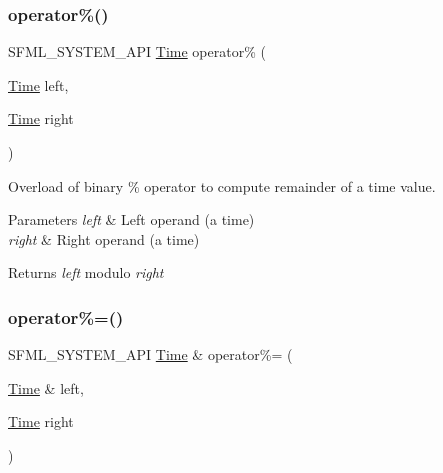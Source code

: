 \subsubsection{\texorpdfstring{operator\%()}{operator\%()}}
{\footnotesize\ttfamily S\+F\+M\+L\+\_\+\+S\+Y\+S\+T\+E\+M\+\_\+\+A\+PI \mbox{\hyperlink{classsf_1_1_time}{Time}} operator\% (\begin{DoxyParamCaption}\item[{\mbox{\hyperlink{classsf_1_1_time}{Time}}}]{left,  }\item[{\mbox{\hyperlink{classsf_1_1_time}{Time}}}]{right }\end{DoxyParamCaption})\hspace{0.3cm}{\ttfamily [related]}}



Overload of binary \% operator to compute remainder of a time value. 


\begin{DoxyParams}{Parameters}
{\em left} & Left operand (a time) \\
\hline
{\em right} & Right operand (a time)\\
\hline
\end{DoxyParams}
\begin{DoxyReturn}{Returns}
{\itshape left} modulo {\itshape right} \begin{DoxyVerb}\end{DoxyVerb}
 
\end{DoxyReturn}
\mbox{\label{classsf_1_1_time_af12dd271f14a17b58c9d737395e776d4}} 
\subsubsection{\texorpdfstring{operator\%=()}{operator\%=()}}
{\footnotesize\ttfamily S\+F\+M\+L\+\_\+\+S\+Y\+S\+T\+E\+M\+\_\+\+A\+PI \mbox{\hyperlink{classsf_1_1_time}{Time}} \& operator\%= (\begin{DoxyParamCaption}\item[{\mbox{\hyperlink{classsf_1_1_time}{Time}} \&}]{left,  }\item[{\mbox{\hyperlink{classsf_1_1_time}{Time}}}]{right }\end{DoxyParamCaption})\hspace{0.3cm}{\ttfamily [related]}}




